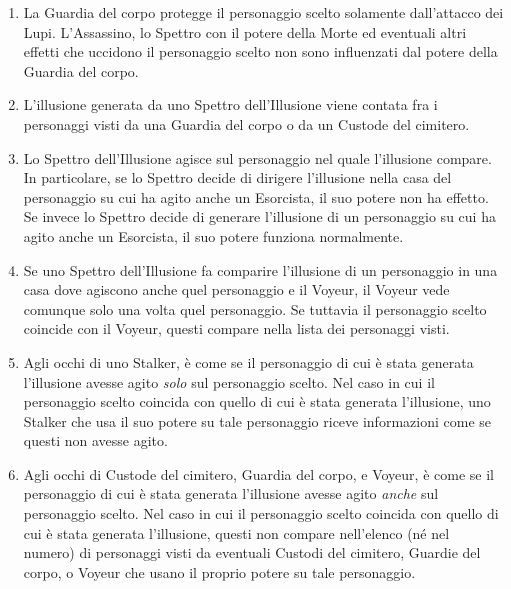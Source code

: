 \documentclass[a4paper,10pt]{article}
\begin{document}
\begin{enumerate}
	\item La Guardia del corpo protegge il personaggio scelto solamente dall'attacco dei Lupi. L'Assassino, lo Spettro con il potere della Morte ed eventuali altri effetti che uccidono il personaggio scelto non sono influenzati dal potere della Guardia del corpo.
	
	\item L'illusione generata da uno Spettro dell'Illusione viene contata fra i personaggi visti da una Guardia del corpo o da un Custode del cimitero.
	
	\item Lo Spettro dell'Illusione agisce sul personaggio nel quale l'illusione compare. In particolare, se lo Spettro decide di dirigere l'illusione nella casa del personaggio su cui ha agito anche un Esorcista, il suo potere non ha effetto. Se invece lo Spettro decide di generare l'illusione di un personaggio su cui ha agito anche un Esorcista, il suo potere funziona normalmente.
	
	\item Se uno Spettro dell'Illusione fa comparire l'illusione di un personaggio in una casa dove agiscono anche quel personaggio e il Voyeur, il Voyeur vede comunque solo una volta quel personaggio. Se tuttavia il personaggio scelto coincide con il Voyeur, questi compare nella lista dei personaggi visti.
	
	\item Agli occhi di uno Stalker, è come se il personaggio di cui è stata generata l'illusione avesse agito \emph{solo} sul personaggio scelto. Nel caso in cui il personaggio scelto coincida con quello di cui è stata generata l'illusione, uno Stalker che usa il suo potere su tale personaggio riceve informazioni come se questi non avesse agito.
	
	\item Agli occhi di Custode del cimitero, Guardia del corpo, e Voyeur, è come se il personaggio di cui è stata generata l'illusione avesse agito \emph{anche} sul personaggio scelto. Nel caso in cui il personaggio scelto coincida con quello di cui è stata generata l'illusione, questi non compare nell'elenco (né nel numero) di personaggi visti da eventuali Custodi del cimitero, Guardie del corpo, o Voyeur che usano il proprio potere su tale personaggio.
	

\end{enumerate}
\end{document}
